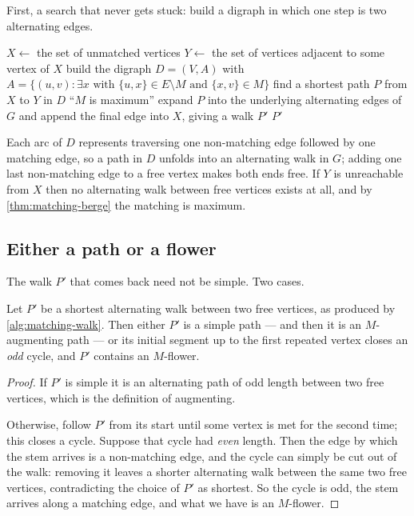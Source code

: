 First, a search that never gets stuck: build a digraph in which one step is two
alternating edges.

\begin{algorithm}[ht]
\caption{Find an $M$-alternating walk between two free vertices}
\label{alg:matching-walk}
\begin{algorithmic}[1]
  \State $X \gets$ the set of unmatched vertices
  \State $Y \gets$ the set of vertices adjacent to some vertex of $X$
  \State build the digraph $D = (V,A)$ with
         $A = \{(u,v) : \exists x \text{ with } \{u,x\} \in E \setminus M
         \text{ and } \{x,v\} \in M\}$
  \State find a shortest path $P$ from $X$ to $Y$ in $D$
   \Return ``$M$ is maximum'' \EndIf
  \State expand $P$ into the underlying alternating edges of $G$ and append the
         final edge into $X$, giving a walk $P'$
  \State \Return $P'$
\end{algorithmic}
\end{algorithm}

Each arc of $D$ represents traversing one non-matching edge followed by one
matching edge, so a path in $D$ unfolds into an alternating walk in $G$; adding
one last non-matching edge to a free vertex makes both ends free. If $Y$ is
unreachable from $X$ then no alternating walk between free vertices exists at
all, and by \cref{thm:matching-berge} the matching is maximum.

\subsection{Either a path or a flower}
\label{sec:matching-path-or-flower}

The walk $P'$ that comes back need not be simple. Two cases.

\begin{lemma}\label{lem:matching-path-or-flower}
Let $P'$ be a shortest alternating walk between two free vertices, as produced
by \cref{alg:matching-walk}. Then either $P'$ is a simple path --- and then it
is an $M$-augmenting path --- or its initial segment up to the first repeated
vertex closes an \emph{odd} cycle, and $P'$ contains an $M$-flower.
\end{lemma}

\begin{proof}
If $P'$ is simple it is an alternating path of odd length between two free
vertices, which is the definition of augmenting.

Otherwise, follow $P'$ from its start until some vertex is met for the second
time; this closes a cycle. Suppose that cycle had \emph{even} length. Then the
edge by which the stem arrives is a non-matching edge, and the cycle can simply
be cut out of the walk: removing it leaves a shorter alternating walk between
the same two free vertices, contradicting the choice of $P'$ as shortest. So the
cycle is odd, the stem arrives along a matching edge, and what we have is an
$M$-flower.
\end{proof}

